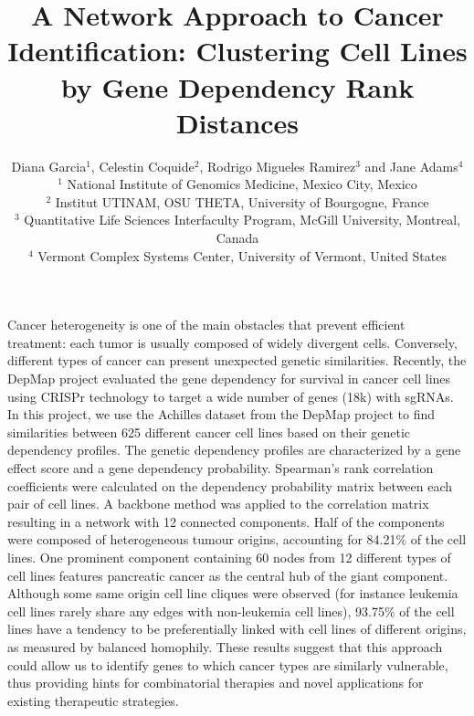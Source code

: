 \documentclass[12pt]{article}
\begin{document}
\title{\normalsize\bf \vspace{-10ex}
A Network Approach to Cancer Identification: Clustering Cell Lines by Gene Dependency Rank Distances}

\begingroup\onehalfspacing
\author{\vspace{-3ex}Diana Garcia$^1$, Celestin Coquide$^2$, Rodrigo Migueles Ramirez$^3$ and Jane Adams$^4$\\
\footnotesize
$^1$ National Institute of Genomics Medicine, Mexico City, Mexico\\ 
$^2$ Institut UTINAM, OSU THETA, University of Bourgogne, France\\
$^3$ Quantitative Life Sciences Interfaculty Program, McGill University, Montreal, Canada\\
$^4$ Vermont Complex Systems Center, University of Vermont, United States}
\endgroup



\date{\vspace{-8ex}} %

\maketitle

\thispagestyle{empty}
\pagestyle{empty}
Cancer heterogeneity is one of the main obstacles that prevent efficient treatment: each tumor is usually composed of widely divergent cells. Conversely, different types of cancer can present unexpected genetic similarities. Recently, the DepMap project \cite{Tsherniak17} evaluated the gene dependency for survival in cancer cell lines using CRISPr technology to target a wide number of genes (18k) with sgRNAs. In this project, we use the Achilles dataset from the DepMap project to find similarities between 625 different cancer cell lines based on their genetic dependency profiles. The genetic dependency profiles are characterized by a gene effect score and a gene dependency probability. Spearman’s rank correlation coefficients were calculated on the dependency probability matrix between each pair of cell lines. A backbone method  \cite{Serrano09} was applied to the correlation matrix resulting in a network with 12 connected components. Half of the components were composed of heterogeneous tumour origins, accounting for 84.21$\%$ of the cell lines. One prominent component containing 60 nodes from 12 different types of cell lines features pancreatic cancer as the central hub of the giant component. Although some same origin cell line cliques were observed (for instance leukemia cell lines rarely share any edges with non-leukemia cell lines), 93.75$\%$ of the cell lines have a tendency to be preferentially linked with cell lines of different origins, as measured by balanced homophily. These results suggest that this approach could allow us to identify genes to which cancer types are similarly vulnerable, thus providing hints for combinatorial therapies and novel applications for existing therapeutic strategies. 
\end{document}
